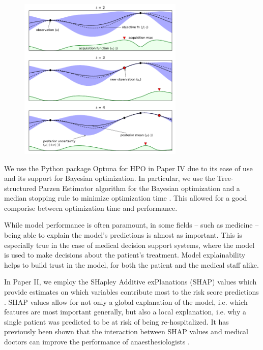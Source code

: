 \begin{figure}[htbp]
    \centering
    \includegraphics[width=0.7\textwidth]{figures/MasterThesis-hpo-bayesian}
\end{figure}

We use the Python package Optuna \autocite{akibaOptunaNextgenerationHyperparameter2019} for HPO in Paper IV due to its ease of use and its support for Bayesian optimization. In particular, we use the Tree-structured Parzen Estimator algorithm for the Bayesian optimization and a median stopping rule to minimize optimization time \autocite{bergstraAlgorithmsHyperParameterOptimization2011}. This allowed for a good comporise between optimization time and performance.

While model performance is often paramount, in some fields -- such as medicine -- being able to explain the model's predictions is almost as important. This is especially true in the case of medical decision support systems, where the model is used to make decisions about the patient's treatment. Model explainability helps to build trust in the model, for both the patient and the medical staff alike.

In Paper II, we employ the SHapley Additive exPlanations (SHAP) values which provide estimates on which variables contribute most to the risk score predictions \autocite{lundbergUnifiedApproachInterpreting2017,lundbergLocalExplanationsGlobal2020}. SHAP values allow for not only a global explanation of the model, i.e. which features are most important generally, but also a local explanation, i.e. why a single patient was predicted to be at risk of being re-hospitalized. It has previously been shown that the interaction between SHAP values and medical doctors can improve the performance of anaesthesiologists  \autocite{lundbergExplainableMachinelearningPredictions2018a}.

